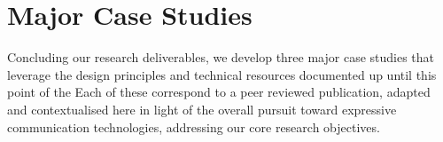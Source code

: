 
\chapter{Major Case Studies}
\label{cha:case_studies}

Concluding our research deliverables, we develop three major case studies that leverage the design principles and technical resources documented up until this point of the  Each of these correspond to a peer reviewed publication, adapted and contextualised here in light of the overall pursuit toward expressive communication technologies, addressing our core research objectives.







\newpage
